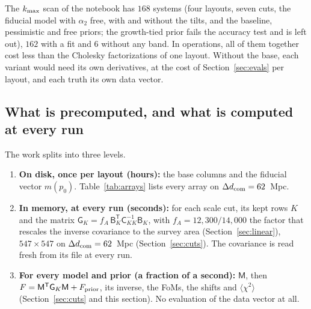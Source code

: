 \documentclass[11pt]{article}
\newcommand{\Cov}{\mathsf{C}}
\newcommand{\T}{^{\mathsf{T}}}
\newcommand{\kmax}{k_{\rm max}}
\newcommand{\mB}{\mathsf{B}}
\newcommand{\mM}{\mathsf{M}}
\newcommand{\mG}{\mathsf{G}}
\begin{document}
The $\kmax$ scan of the notebook has $168$ systems (four
layouts, seven cuts, the fiducial model with $\alpha_2$ free, with
and without the tilts, and the baseline,
pessimistic and
free priors; the growth-tied prior fails the accuracy test and is left
out), $162$ with a fit and $6$ without any band.  In operations, all of
them together cost less than the Cholesky factorizations of one layout.
Without the base, each variant would need its own derivatives, at the
cost of Section~\ref{sec:evals} per layout, and each truth its own data
vector.

\subsection{What is precomputed, and what is computed at every run}
\label{sec:precomputed}

The work splits into three levels.
\begin{enumerate}
  \item \textbf{On disk, once per layout (hours):} the base columns and
    the fiducial vector $m(p_0)$.  Table~\ref{tab:arrays} lists every
    array on $\Delta d_{\rm com} = 62$~Mpc.
  \item \textbf{In memory, at every run (seconds):} for each scale
    cut, its kept rows $K$ and the matrix
    $\mG_K = f_A\,\mB_K\T\Cov_{KK}^{-1}\mB_K$, with
    $f_A = 12{,}300/14{,}000$ the factor that rescales the inverse
    covariance to the survey area (Section~\ref{sec:linear}),
    $547 \times 547$ on
    $\Delta d_{\rm com} = 62$~Mpc (Section~\ref{sec:cuts}).  The
    covariance is read fresh from its file at every run.
  \item \textbf{For every model and prior (a fraction of a second):}
    $\mM$, then $F = \mM\T\mG_K\mM + F_{\rm prior}$, its inverse, the
    FoMs, the shifts and $\langle\chi^2\rangle$
    (Section~\ref{sec:cuts} and this section).  No evaluation
    of the data vector at all.
\end{enumerate}
\end{document}
